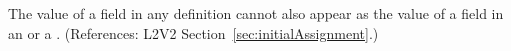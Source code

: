 The value of a  field in any \InitialAssignment definition
cannot also appear as the value of a  field in an
\AssignmentRule or a \RateRule.  (References: L2V2
Section~\ref{sec:initialAssignment}.)
